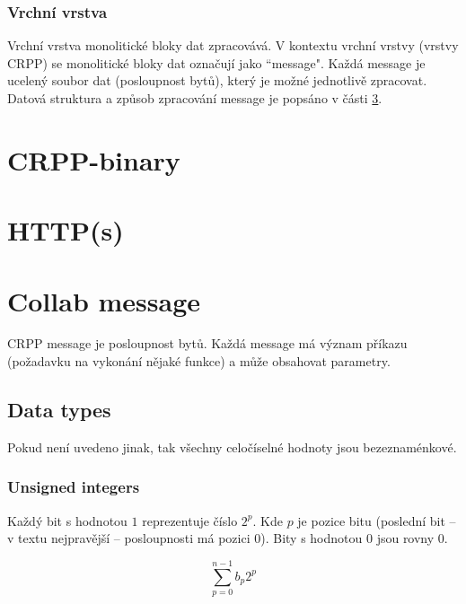 \documentclass[12pt,oneside,a4paper]{report}
\begin{document}
\subsection{Vrchní vrstva}

Vrchní vrstva monolitické bloky dat zpracovává. V kontextu vrchní vrstvy (vrstvy CRPP) se monolitické bloky dat označují jako ``message". Každá message je ucelený soubor dat (posloupnost bytů), který je možné jednotlivě zpracovat. Datová struktura a způsob zpracování message je popsáno v části \ref{text.collab_message}.

\chapter{CRPP-binary}
\label{chapter.crpp-binary}


\chapter{HTTP(s)}
\label{chapter.http}


\chapter{Collab message}
\label{text.collab_message}

CRPP message je posloupnost bytů. Každá message má význam příkazu (požadavku na vykonání nějaké funkce) a může obsahovat parametry.

\section{Data types}

Pokud není uvedeno jinak, tak všechny celočíselné hodnoty jsou bezeznaménkové.

\subsection{Unsigned integers}
\label{subsection.unsigned-integers}

Každý bit s hodnotou $1$ reprezentuje číslo $2^{p}$. Kde $p$ je pozice bitu (poslední bit -- v textu nejpravější -- posloupnosti má pozici $0$). Bity s hodnotou $0$ jsou rovny $0$.

\begin{equation}
\label{equation.unsigned-integers-sum}
\sum_{p = 0}^{n - 1} b_p 2^p
\end{equation}
\end{document}

